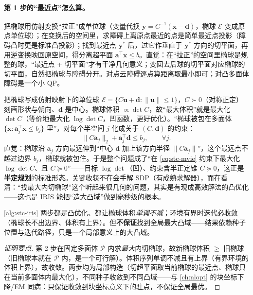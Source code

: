 \paragraph{第 1 步的“最近点”怎么算。}
把椭球用仿射变换“拉正”成单位球（变量代换 $\mathbf{y}=C^{-1}(\mathbf{x}-\mathbf{d})$，椭球 $\mathcal{E}$ 变成原点单位球）；在变换后的空间里，求障碍上离原点最近的点是简单最近点投影（障碍凸时更是标准凸投影）；找到最近点 $\mathbf{y}^*$ 后，过它作垂直于 $\mathbf{y}^*$ 方向的切平面，再用逆变换映回原空间，得分离超平面 $\mathbf{a}^\top\mathbf{x}\le b$。直觉：在“拉正”的空间里椭球是规整的球，“最近点 + 切平面”才有干净几何意义；变回去后球的切平面对应椭球的切平面，自然把椭球与障碍分开。对点云障碍逐点算距离取最小即可；对凸多面体障碍是一个小 QP。

\begin{derivation}\label{der:stc-mvie}
把椭球写成仿射映射下的单位球 $\mathcal{E}=\{C\mathbf{u}+\mathbf{d}:\|\mathbf{u}\|\le1\}$，$C\succ0$（对称正定）刻画形状与朝向、$\mathbf{d}$ 是中心。椭球体积 $\propto\det C$，故“最大体积”就是最大化 $\det C$（等价地最大化 $\log\det C$，凹函数，更好优化）。“椭球被包在多面体 $\{\mathbf{x}:\mathbf{a}_j^\top\mathbf{x}\le b_j\}$ 里”，对每个半空间 $j$ 化成关于 $(C,\mathbf{d})$ 的约束：
\begin{equation}
  \|C\mathbf{a}_j\|_2+\mathbf{a}_j^\top\mathbf{d}\le b_j,\qquad\forall j.
  \label{eq:stc-mvie}
\end{equation}
直觉：椭球沿 $\mathbf{a}_j$ 方向最远伸到“中心 $\mathbf{d}$ 加上该方向半径 $\|C\mathbf{a}_j\|$”，这个最远点不越过边界 $b_j$，椭球就被包住。于是整个问题成了“在 \cref{eq:stc-mvie} 约束下最大化 $\log\det C$、且 $C\succeq0$”——目标 $\log\det$（凹）、约束含半正定锥 $C\succeq0$，这正是\textbf{半定规划}的标准形态。关键收获不在会手解 SDP（有成熟求解器），而在看清：“找最大内切椭球”这个听起来很几何的问题，其实是有现成高效解法的凸优化——这也是 IRIS 能把“造大凸域”做到毫秒级的根本。
\end{derivation}

\begin{theorem}\label{thm:stc-iris-conv}
\cref{alg:stc-iris} 两步都是凸优化、都让椭球体积\emph{单调不减}；环境有界时迭代必收敛（椭球长不出边界、体积有上界）。但\textbf{不保证}找到全局最大凸域——结果依赖种子位置与迭代路径，只是一个局部意义上的大凸域。
\end{theorem}
\begin{proof}[证明要点]
第 2 步在固定多面体 $\mathcal{P}$ 内求\emph{最大}内切椭球，故新椭球体积 $\ge$ 旧椭球（旧椭球本就在 $\mathcal{P}$ 内，是一个可行解）。体积序列单调不减且有上界（有界环境的体积上界），故收敛。两步均为局部构造（切超平面取当前椭球的最近点、椭球只在当前多面体内最大化），不同种子收敛到不同凸域——与 \cref{ch:nlopt} 的块坐标下降/EM 同病：只保证收敛到块坐标意义下的驻点，不保证全局最优。
\end{proof}

